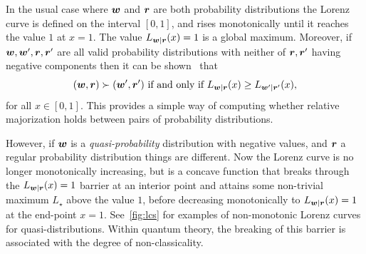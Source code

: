 \documentclass[pra,
aps,
twocolumn,
superscriptaddress,
groupedaddress,
nofootinbib,
reprint
]{revtex4-1}
\begin{document}
In the usual case where $\boldsymbol{w}$ and $\boldsymbol{r}$ are both probability distributions the Lorenz curve is defined on the interval $[0,1]$, and rises monotonically until it reaches the value $1$ at $x=1$. The value $L_{\boldsymbol{w}|\boldsymbol{r}}(x) = 1$ is a global maximum. Moreover, if $\boldsymbol{w}, \boldsymbol{w}', \boldsymbol{r}, \boldsymbol{r}'$ are all valid probability distributions with neither of $\boldsymbol{r},\boldsymbol{r}'$ having negative components then it can be shown~\cite{ruch_mixing_1978} that
\begin{equation}
(\boldsymbol{w}, \boldsymbol{r}) \succ (\boldsymbol{w}', \boldsymbol{r}') \mbox{ if and only if } L_{\boldsymbol{w} |\boldsymbol{r}}(x) \ge L_{\boldsymbol{w}' |\boldsymbol{r}'}(x),
\end{equation}
for all $x \in [0,1]$.
This provides a simple way of computing whether relative majorization holds between pairs of probability distributions.

However, if $\boldsymbol{w}$ is a \emph{quasi-probability} distribution with negative values, and $\boldsymbol{r}$ a regular probability distribution things are different. Now the Lorenz curve is no longer monotonically increasing, but is a concave function that breaks through the $L_{\boldsymbol{w}|\boldsymbol{r}}(x) = 1$ barrier at an interior point and attains some non-trivial maximum $L_\star$ above the value $1$, before decreasing monotonically to $L_{\boldsymbol{w}|\boldsymbol{r}}(x)= 1$ at the end-point $x=1$. See~\cref{fig:lcs} for examples of non-monotonic Lorenz curves for quasi-distributions. Within quantum theory, the breaking of this barrier is associated with the degree of non-classicality.
\end{document}
